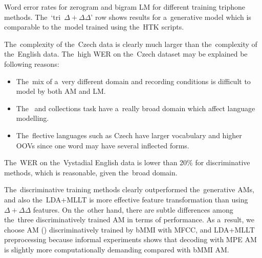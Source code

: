 \begin{table}[h]

\caption{Word error rates for zerogram and bigram LM for different training triphone methods.
    The~`tri~$\Delta+\Delta\Delta$' row shows results for a~generative model which is comparable to the~model trained using the~HTK scripts.
}
\label{tab:best}
\end{table}

The~complexity of the~Czech data is clearly much larger than the~complexity of the~English data.
The~high \ac{WER} on the~Czech dataset may be explained be following reasons:
\begin{itemize}
    \item The~mix of a~very different domain and recording conditions is difficult to model by both \ac{AM} and \ac{LM}. 
    \item The~ and  collections task have a~really broad domain which affect language modelling.
    \item The~flective languages such as Czech have larger vocabulary and higher \acp{OOV} since one word may have several inflected forms.
\end{itemize}

The~\ac{WER} on the~Vystadial English data is lower than 20\% for discriminative methods, which is reasonable, given the~broad domain.

The~discriminative training methods clearly outperformed the~generative \acp{AM}, and also the~\ac{LDA}+\ac{MLLT} is more effective feature transformation than using $\Delta+\Delta\Delta$ features.
On the~other hand, there are subtle differences among the~three discriminatively trained \ac{AM} in terms of performance.
As a~result, we choose \ac{AM} () discriminatively trained by \ac{bMMI} with \ac{MFCC}, and \ac{LDA}+\ac{MLLT} preprocessing because informal experiments shows that decoding with \ac{MPE} \acl{AM} is slightly more computationally demanding compared with \ac{bMMI} \ac{AM}. 


